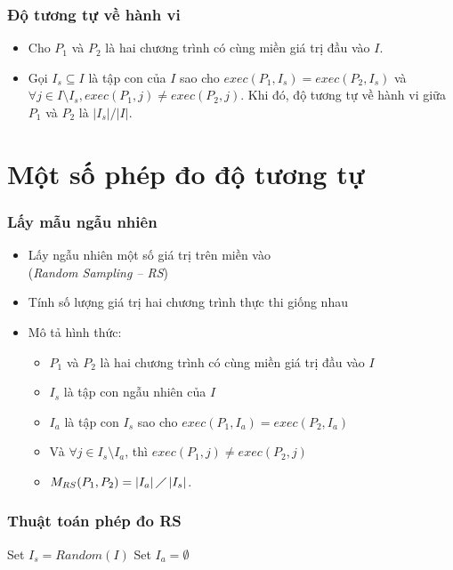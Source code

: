 \documentclass{beamer}
\begin{document}
\begin{frame}
  \frametitle{Độ tương tự về hành vi}
  \begin{itemize}
  	\item  Cho $P_{1}$ và $P_{2}$ là hai chương trình có cùng miền giá trị đầu
  	vào $I$. 
  	\item Gọi $I_{s} \subseteq I$ là tập con của $I$ sao cho
  	$exec(P_{1}, I_{s}) = exec(P_{2}, I_{s})$ và
  	$\forall j \in I \setminus I_{s}, exec(P_{1}, j) \neq exec(P_{2},
  	j)$. Khi đó, độ tương tự về hành vi giữa $P_1$ và $P_2$ là $|I_s|/|I|$.
  \end{itemize}
\end{frame}


\section{Một số phép đo độ tương tự}
\begin{frame}
  \frametitle{Lấy mẫu ngẫu nhiên}
  \begin{itemize}  	
  	\item Lấy ngẫu nhiên một số giá trị trên miền vào \\(\emph{Random
  		Sampling -- RS})
  	\item Tính số lượng giá trị hai chương trình
  	thực thi giống nhau
  	\item Mô tả hình thức:
  	\begin{itemize}
  		\item $P_{1}$ và $P_{2}$ là hai chương trình có cùng miền giá trị đầu
  		vào $I$
  		\item $I_{s}$ là tập con ngẫu nhiên của $I$
  		\item $I_{a}$ là tập con
  		$I_{s}$ sao cho $exec(P_{1}, I_a) = exec(P_{2}, I_a)$
  		\item Và $\forall j \in I_{s} \setminus I_{a}$, thì
  		$exec(P_{1}, j) \neq exec(P_{2}, j)$
  		\item $M_{RS}(P_{1}, P_{2}) = \left|I_{a}\right| \diagup
  		\left|I_{s}\right| $.
  	\end{itemize}
  \end{itemize}
\end{frame}


\begin{frame}
  \frametitle{Thuật toán phép đo RS}
  \begin{algorithm}[H]
	Set $I_{s} = Random(I)$ \;
	Set $I_{a} = \emptyset$\;
  	{  			
  	}
  \end{algorithm}
\end{frame}
\end{document}
